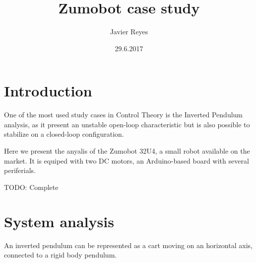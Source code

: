\documentclass{article}
\title{Zumobot case study}
\date{29.6.2017}
\author{Javier Reyes}
\begin{document}
\maketitle
{}
\newpage
{}

\tableofcontents
\newpage

\section*{Introduction}

One of the most used study cases in Control Theory is the Inverted Pendulum analysis, as it present an unstable open-loop characteristic but is also possible to stabilize on a closed-loop configuration.

Here we present the anyalis of the Zumobot 32U4, a small robot available on the market. It is equiped with two DC motors, an Arduino-based board with several periferials.

TODO: Complete

\section{System analysis}

An inverted pendulum can be represented as a cart moving on an horizontal axis, connected to a rigid body pendulum.

\end{document}
